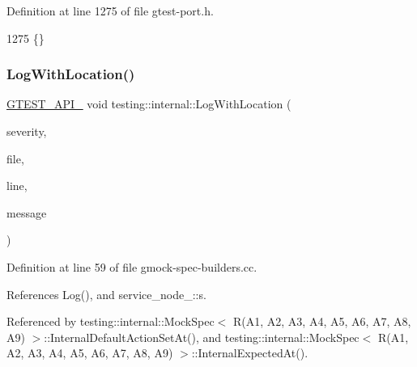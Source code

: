 Definition at line 1275 of file gtest-\/port.\+h.


\begin{DoxyCode}
1275 \{\}
\end{DoxyCode}
\mbox{\label{namespacetesting_1_1internal_af271cd1fc0b62a7f4736cb3109e86a37}} 
\subsubsection{\texorpdfstring{Log\+With\+Location()}{LogWithLocation()}}
{\footnotesize\ttfamily \hyperlink{gtest-port_8h_aa73be6f0ba4a7456180a94904ce17790}{G\+T\+E\+S\+T\+\_\+\+A\+P\+I\+\_\+} void testing\+::internal\+::\+Log\+With\+Location (\begin{DoxyParamCaption}\item[{\hyperlink{namespacetesting_1_1internal_a203d1a8a2147a53d12bbdae40d443914}{testing\+::internal\+::\+Log\+Severity}}]{severity,  }\item[{const char $\ast$}]{file,  }\item[{int}]{line,  }\item[{const \hyperlink{namespacetesting_1_1internal_a8e8ff5b11e64078831112677156cb111}{string} \&}]{message }\end{DoxyParamCaption})}



Definition at line 59 of file gmock-\/spec-\/builders.\+cc.



References Log(), and service\+\_\+node\+\_\+::s.



Referenced by testing\+::internal\+::\+Mock\+Spec$<$ R(\+A1, A2, A3, A4, A5, A6, A7, A8, A9) $>$\+::\+Internal\+Default\+Action\+Set\+At(), and testing\+::internal\+::\+Mock\+Spec$<$ R(\+A1, A2, A3, A4, A5, A6, A7, A8, A9) $>$\+::\+Internal\+Expected\+At().


